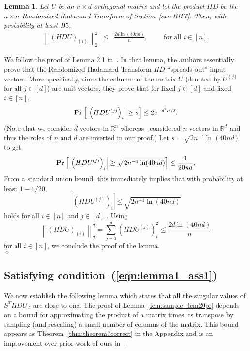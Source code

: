 \documentclass[11pt]{article}
\newcommand{\Probab}[1]{\mbox{}{\bf{Pr}}\left[#1\right]}
\newcommand{\VTTNormS}[1]{\mbox{}\left\|#1\right\|_2^2}
\newcommand{\abs }[1]{\left|#1\right|}
\newtheorem{lemma}{Lemma}
\newenvironment{Proof}{\noindent {\em Proof:}}{\\\hspace*{\fill}\mbox{$\diamond$}}
\begin{document}
\begin{lemma} \label{lem:HU}
Let $U$ be an $n \times d$ orthogonal matrix and let the product $HD$ be the $n \times n$ Randomized Hadamard Transform of Section~\ref{sxn:RHT}. Then, with probability at least $.95$,
\begin{eqnarray}
\label{eqn:lem:HU_eqn2} \VTTNormS{\left(HDU\right)_{(i)}}
   &\leq& \frac{2d\ln(40nd)}{n},\qquad
       \text{ for all } i \in [n]   .
\end{eqnarray}


\end{lemma}
\begin{Proof}
We follow the proof of Lemma 2.1 in~\cite{AC06}. In that lemma, the authors essentially prove that the Randomized Hadamard Transform $HD$ ``spreads out'' input vectors. More specifically, since the columns of the matrix $U$ (denoted by $U^{(j)}$ for all $j \in [d]$) are unit vectors, they prove that for fixed $j \in [d]$ and fixed $i \in [n]$,
$$\Probab{\abs{\left(HDU^{(j)}\right)_i}\geq s}\leq 2 e^{-s^2 n/2}.$$
(Note that we consider $d$ vectors in $\mathbb{R}^n$ whereas~\cite{AC06} considered $n$ vectors in $\mathbb{R}^d$ and thus the roles of $n$ and $d$ are inverted in our proof.) Let $s = \sqrt{2n^{-1}\ln(40nd)}$ to get
$$\Probab{\abs{\left(HDU^{(j)}\right)_i}\geq \sqrt{2n^{-1}\ln(40nd)}}\leq \frac{1}{20nd}.$$
From a standard union bound, this immediately implies that with probability at least $1-1/20$,
\begin{equation}\label{eqn:eqpd12}
\abs{\left(HDU^{(j)}\right)_i}\leq \sqrt{2n^{-1}\ln(40nd)}
\end{equation}
holds for all $i \in [n]$ and $j \in [d]$ . Using
\begin{equation}\label{eqn:eqP1}
\VTTNormS{\left(HDU\right)_{(i)}} = \sum_{j=1}^d \left(HDU^{(j)}\right)_i^2 \leq \frac{2d\ln(40nd)}{n}
\end{equation}
for all $i \in [n]$, we conclude the proof of the lemma.
\end{Proof}

\subsection{Satisfying condition~(\ref{eqn:lemma1_ass1})}

We now establish the following lemma which states that all the singular values of $S^THDU_A$ are close to one. The proof of Lemma~\ref{lem:sample_lem20pf} depends on a bound for approximating the product of a matrix times its transpose by sampling (and rescaling) a small number of columns of the matrix. This bound appears as Theorem~\ref{thm:theorem7correct} in the Appendix and is an improvement over prior work of ours in~\cite{DMM08_CURtheory_JRNL}.
\end{document}
